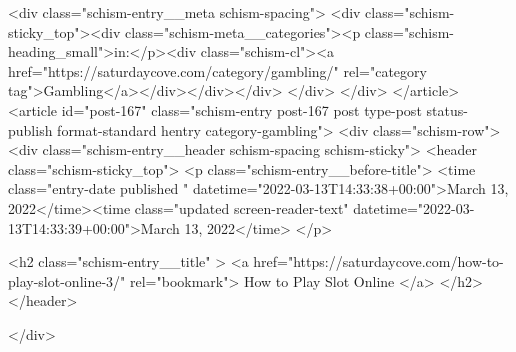 {		<div class="schism-entry__meta schism-spacing">			<div class="schism-sticky_top"><div class="schism-meta__categories"><p class="schism-heading_small">in:</p><div class="schism-cl"><a href="https://saturdaycove.com/category/gambling/" rel="category tag">Gambling</a></div></div></div>		</div>
	</div>
</article>
<article id="post-167" class="schism-entry post-167 post type-post status-publish format-standard hentry category-gambling">
	<div class="schism-row">		<div class="schism-entry__header schism-spacing schism-sticky">			<header class="schism-sticky_top">				<p class="schism-entry__before-title">
					<time class="entry-date published " datetime="2022-03-13T14:33:38+00:00">March 13, 2022</time><time class="updated screen-reader-text" datetime="2022-03-13T14:33:39+00:00">March 13, 2022</time>				</p>

				<h2 class="schism-entry__title" >
					<a href="https://saturdaycove.com/how-to-play-slot-online-3/" rel="bookmark">
						How to Play Slot Online					</a>
				</h2>
			</header>

					</div>

}
